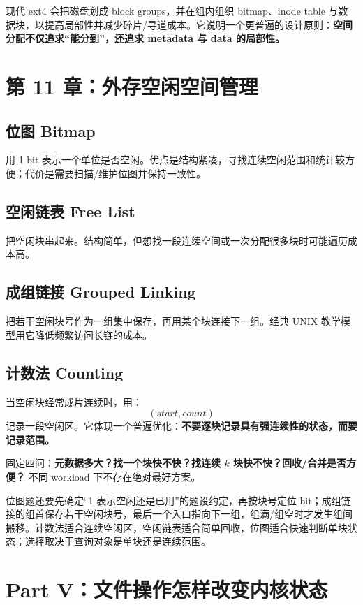 \documentclass[11pt,a4paper]{ctexart}
\newcommand{\kw}[1]{\textbf{#1}}
\begin{document}
\begin{eng}
现代 ext4 会把磁盘划成 block groups，并在组内组织 bitmap、inode table 与数据块，以提高局部性并减少碎片/寻道成本。它说明一个更普遍的设计原则：\kw{空间分配不仅追求“能分到”，还追求 metadata 与 data 的局部性。}
\end{eng}

\section{第 11 章：外存空闲空间管理}

\subsection{位图 Bitmap}
用 1 bit 表示一个单位是否空闲。优点是结构紧凑，寻找连续空闲范围和统计较方便；代价是需要扫描/维护位图并保持一致性。

\subsection{空闲链表 Free List}
把空闲块串起来。结构简单，但想找一段连续空间或一次分配很多块时可能遍历成本高。

\subsection{成组链接 Grouped Linking}
把若干空闲块号作为一组集中保存，再用某个块连接下一组。经典 UNIX 教学模型用它降低频繁访问长链的成本。

\subsection{计数法 Counting}
当空闲块经常成片连续时，用：
\[
(start, count)
\]
记录一段空闲区。它体现一个普遍优化：\kw{不要逐块记录具有强连续性的状态，而要记录范围。}

\begin{exam}
固定四问：\kw{元数据多大？找一个块快不快？找连续 $k$ 块快不快？回收/合并是否方便？} 不同 workload 下不存在绝对最好方案。
\end{exam}

位图题还要先确定“1 表示空闲还是已用”的题设约定，再按块号定位 bit；成组链接的组首保存若干空闲块号，最后一个入口指向下一组，组满/组空时才发生组间搬移。计数法适合连续空闲区，空闲链表适合简单回收，位图适合快速判断单块状态；选择取决于查询对象是单块还是连续范围。

\section{Part V：文件操作怎样改变内核状态}
\end{document}
